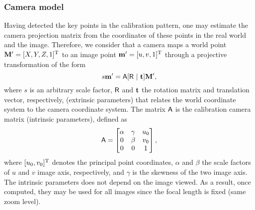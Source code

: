 \subsubsection{Camera model}\label{sec:cam_model}
%
Having detected the key points in the calibration pattern, one may estimate the camera projection matrix from the coordinates of these points in the real world and the image.
Therefore, we consider that a camera maps a world point $\mathbf{M}' = [X,Y,Z,1]^{\mathrm{T}}$ to an image point $\mathbf{m}' = [u,v,1]^{\mathrm{T}}$ through a projective transformation of the form~\cite{Hartley2004}
\begin{equation}
  \label{eq:projection}
  s\mathbf{m}' = \mathsf{A}[\mathsf{R}~|~\mathbf{t}]\mathbf{M}',
\end{equation}
%
where $s$ is an arbitrary scale factor,
$\mathsf{R}$ and $\mathbf{t}$ the rotation matrix and translation vector, respectively, (extrinsic parameters) that relates the world coordinate system to the camera coordinate system.
The matrix $\mathsf{A}$ is the calibration camera matrix (intrinsic parameters), defined as
%
\begin{equation}
\mathsf{A} =
 \begin{bmatrix}
 \alpha & \gamma & u_0\\
      0 & \beta  & v_0\\
      0 &     0  & 1\\
 \end{bmatrix},
\end{equation}
%
where $[u_0,v_0]^{\mathrm{T}}$ denotes the principal point coordinates,
$\alpha$ and $\beta$ the scale factors of $u$ and $v$ image axis, respectively, and
$\gamma$ is the skewness of the two image axis.
The intrinsic parameters does not depend on the image viewed.
As a result, once computed, they may be used for all images since the focal length is fixed (same zoom level).

